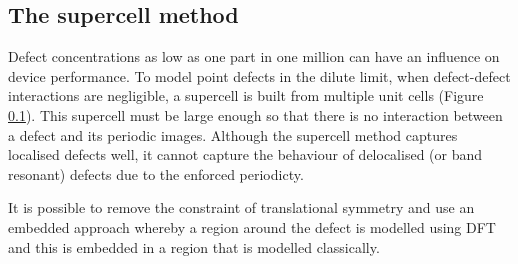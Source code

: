 



\subsection{The supercell method}

Defect concentrations as low as one part in one million can have an influence on device performance. 
To model point defects in the dilute limit, when defect-defect interactions are negligible, a supercell is built from multiple unit cells (Figure \ref{}).
This supercell must be large enough so that there is no interaction between a defect and its periodic images.
Although the supercell method captures localised defects well, it cannot capture the behaviour of delocalised (or band resonant) defects due to the enforced periodicty. 

It is possible to remove the constraint of translational symmetry and use an embedded approach whereby a region around the defect is modelled using DFT and this is embedded in a region that is modelled classically.

